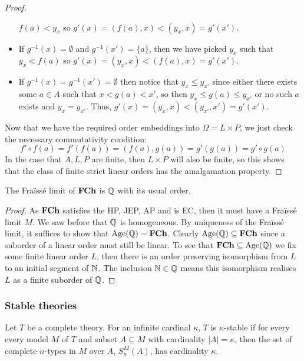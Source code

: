 \begin{proof}
\begin{itemize}
      $f(a) < y_x$ so $g'(x) = (f(a),x) < (y_x, x) = g'(x')$.
    \item If $g^{-1}(x) = \emptyset$ and $g^{-1}(x') = \{a\}$, then we have picked $y_x$ such that
      $y_x < f(a)$ so $g'(x) = (y_x, x) < (f(a),x) = g'(x')$.
    \item If $g^{-1}(x) = g^{-1}(x') = \emptyset$ then notice that $y_x \leq y_{x'}$ since
      either there exists some $a \in A$ such that $x < g(a) < x'$, so then
      $y_x \leq g(a) \leq y_{x'}$ or no such $a$ exists and $y_x = y_{x'}$. Thus,
      $g'(x) = (y_x,x) < (y_{x'}, x') = g'(x')$.
  \end{itemize}
  Now that we have the required order embeddings into $\Omega = L \times P$, we just check the
  necessary commutativity condition:
  \begin{equation*}
    f' \circ f(a) = f'(f(a)) = (f(a),g(a)) = g'(g(a)) = g' \circ g(a)
  \end{equation*}
  In the case that $A,L,P$ are finite, then $L \times P$ will also be finite, so this
  shows that the class of finite strict linear orders has the amalgamation property.
\end{proof}

\begin{thm}
  The Fraïssé limit of $\textbf{FCh}$ is $\mathbb{Q}$ with its usual order.
\end{thm}
\begin{proof}
  As $\textbf{FCh}$ satisfies the HP, JEP, AP and is EC, then it must have a Fraïssé limit $M$. We saw
  before that $\mathbb{Q}$ is homogeneous. By uniqueness of the Fraïssé limit, it suffices to show that
  $\operatorname{Age}(\mathbb{Q}) = \textbf{FCh}$. Clearly $\operatorname{Age}(\mathbb{Q}) \subseteq \textbf{FCh}$ since
  a suborder of a linear order must still be linear. To see that $\textbf{FCh} \subseteq \operatorname{Age}(\mathbb{Q})$ we fix
  some finite linear order $L$, then there is an order preserving isomorphism from $L$ to an initial
  segment of $\mathbb{N}$. The inclusion $\mathbb{N} \in \mathbb{Q}$ means this isomorphism realises $L$ as a finite
  suborder of $\mathbb{Q}$.
\end{proof}

\subsubsection{Stable theories}%
\label{ssub:stable_theories}

\begin{defn}
  Let $T$ be a complete theory. For an infinite cardinal $\kappa$, $T$ is
  $\kappa$-stable if for every every model $M$ of $T$ and subset $A \subseteq M$ with cardinality
  $|A| = \kappa$, then the set of complete $n$-types in $M$ over $A$,  $S_n^M(A)$, has cardinality
  $\kappa$.
\end{defn}

